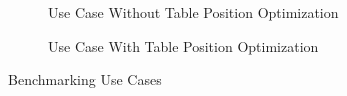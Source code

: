 \begin{figure}[!htbp] %
	\centering
	\begin{subfigure}[b]{0.4\textwidth}
		\caption{Use Case Without Table Position Optimization}  
		\label{bm:uc1}
	\end{subfigure}
	\begin{subfigure}[b]{0.4\textwidth}
		\caption{Use Case With Table Position Optimization}  
		\label{bm:uc2}
	\end{subfigure}	
	\caption{Benchmarking Use Cases}
	\label{bm:uc}
\end{figure}

